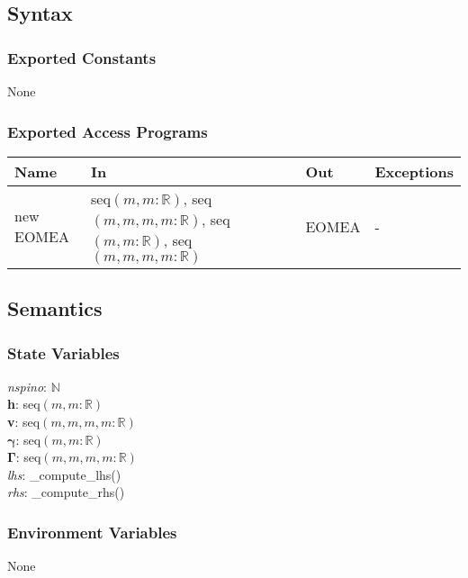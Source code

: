 \documentclass[12pt, titlepage]{article}
\begin{document}
\subsection{Syntax}

\subsubsection{Exported Constants}
None

\subsubsection{Exported Access Programs}

\begin{center}
	\begin{tabular}{p{2.3cm} p{4cm} p{4cm} p{2cm}}
		\hline
		\textbf{Name} & \textbf{In} & \textbf{Out} & \textbf{Exceptions} \\
		\hline
		new EOMEA & seq$(m,m:\mathbb{R})$, seq$(m,m,m,m:\mathbb{R})$, 
		seq$(m,m:\mathbb{R})$, seq$(m,m,m,m:\mathbb{R})$& EOMEA & - \\
		\hline
	\end{tabular}
\end{center}

\subsection{Semantics}

\subsubsection{State Variables}
\textit{nspino}: $\mathbb{N}$\\
\textbf{h}: seq$(m,m:\mathbb{R})$\\
\textbf{v}: seq$(m,m,m,m:\mathbb{R})$\\
$\boldsymbol{\gamma}$: seq$(m,m:\mathbb{R})$\\
$\boldsymbol{\Gamma}$: seq$(m,m,m,m:\mathbb{R})$\\
\textit{lhs}: \_compute\_lhs()\\
\textit{rhs}: \_compute\_rhs()

\subsubsection{Environment Variables}

None
\end{document}
